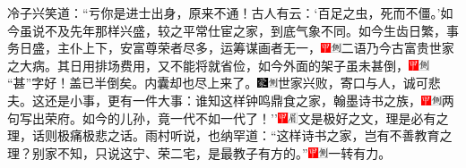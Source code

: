 冷子兴笑道：``亏你是进士出身，原来不通！古人有云：`百足之虫，死而不僵。'如今虽说不及先年那样兴盛，较之平常仕宦之家，到底气象不同。如今生齿日繁，事务日盛，主仆上下，安富尊荣者尽多，运筹谋画者无一，{\includegraphics[width=3mm]{../Images/00002}\includegraphics[width=3mm]{../Images/00011}\footnotesize \kaishu 二语乃今古富贵世家之大病。}其日用排场费用，又不能将就省俭，如今外面的架子虽未甚倒，{\includegraphics[width=3mm]{../Images/00002}\includegraphics[width=3mm]{../Images/00011}\footnotesize \kaishu ``甚''字好！盖已半倒矣。}内囊却也尽上来了。{\includegraphics[width=3mm]{../Images/00006}\includegraphics[width=3mm]{../Images/00011}\footnotesize \kaishu 世家兴败，寄口与人，诚可悲夫。}这还是小事，更有一件大事：谁知这样钟鸣鼎食之家，翰墨诗书之族，{\includegraphics[width=3mm]{../Images/00002}\includegraphics[width=3mm]{../Images/00011}\footnotesize \kaishu 两句写出荣府。}如今的儿孙，竟一代不如一代了！''{\includegraphics[width=3mm]{../Images/00002}\includegraphics[width=3mm]{../Images/00010}\footnotesize \kaishu 文是极好之文，理是必有之理，话则极痛极悲之话。}雨村听说，也纳罕道：``这样诗书之家，岂有不善教育之理？别家不知，只说这宁、荣二宅，是最教子有方的。''{\includegraphics[width=3mm]{../Images/00002}\includegraphics[width=3mm]{../Images/00011}\footnotesize \kaishu 一转有力。}

